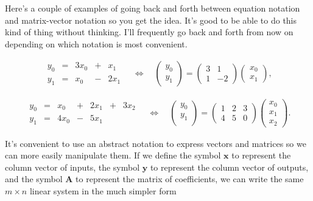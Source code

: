 \documentclass[
  letterpaper,
  DIV=11,
  numbers=noendperiod]{scrreprt}
\begin{document}
Here's a couple of examples of going back and forth between equation
notation and matrix-vector notation so you get the idea. It's good to be
able to do this kind of thing without thinking. I'll frequently go back
and forth from now on depending on which notation is most convenient.

\begin{gather*}
\begin{alignedat}{3}
   y_0 & {}={} & 3x_0 & {}+{} &  x_1  \\
   y_1 & {}={} & x_0 & {}-{} &  2x_1
\end{alignedat}
\quad \Longleftrightarrow \quad
\begin{pmatrix}
y_0 \\
y_1
\end{pmatrix} = 
\begin{pmatrix}
3 & 1 \\
1 & -2
\end{pmatrix}
\begin{pmatrix}
x_0 \\
x_1
\end{pmatrix},
\end{gather*}

\begin{gather*}
\begin{alignedat}{5}
   y_0 & {}={} & x_0 & {}+{} &  2x_1 & {}+{} & 3x_2  \\
   y_1 & {}={} & 4x_0 & {}-{} &  5x_1 & {} {} & 
\end{alignedat}
\quad \Longleftrightarrow \quad
\begin{pmatrix}
y_0 \\
y_1 \\
\end{pmatrix} = 
\begin{pmatrix}
1 & 2 & 3 \\
4 & 5 & 0
\end{pmatrix}
\begin{pmatrix}
x_0 \\
x_1 \\
x_2
\end{pmatrix}.
\end{gather*}

It's convenient to use an abstract notation to express vectors and
matrices so we can more easily manipulate them. If we define the symbol
\(\mathbf{x}\) to represent the column vector of inputs, the symbol
\(\mathbf{y}\) to represent the column vector of outputs, and the symbol
\(\mathbf{A}\) to represent the matrix of coefficients, we can write the
same \(m \times n\) linear system in the much simpler form
\end{document}
